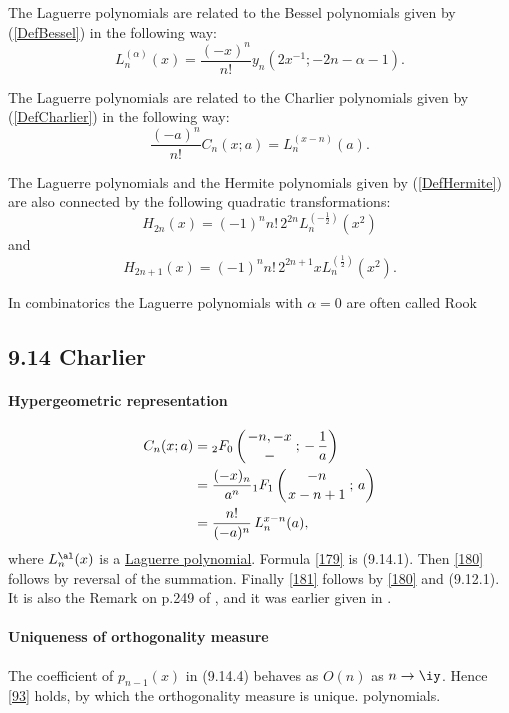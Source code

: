 \documentclass[envcountchap,graybox]{svmono}
\newcommand{\hyp}[5]{\mbox{}_{#1}{F}_{#2}
\left(\genfrac{}{}{0pt}{}{#3}{#4}\,;\,#5\right)}
\begin{document}
\noindent
The Laguerre polynomials are related to the Bessel polynomials given by (\ref{DefBessel})
in the following way:
$$L_n^{(\alpha)}(x)=\frac{(-x)^n}{n!}y_n(2x^{-1};-2n-\alpha-1).$$

\noindent
The Laguerre polynomials are related to the Charlier polynomials given by (\ref{DefCharlier})
in the following way:
$$\frac{(-a)^n}{n!}C_n(x;a)=L_n^{(x-n)}(a).$$

\noindent
The Laguerre polynomials and the Hermite polynomials given by (\ref{DefHermite}) are also
connected by the following quadratic transformations:
$$H_{2n}(x)=(-1)^nn!\,2^{2n}L_n^{(-\frac{1}{2})}(x^2)$$
and
$$H_{2n+1}(x)=(-1)^nn!\,2^{2n+1}xL_n^{(\frac{1}{2})}(x^2).$$

\noindent
In combinatorics the Laguerre polynomials with $\alpha=0$ are often called Rook
\subsection*{9.14 Charlier}
\label{sec9.14}
%
\paragraph{Hypergeometric representation}
\begin{align}
C_n(x;a)&=\hyp20{-n,-x}-{-\,\frac1a}
\label{179}\\
&=\frac{(-x)_n}{a^n} \hyp11{-n}{x-n+1}a
\label{180}\\
&=\frac{n!}{(-a)^n}\,L_n^{x-n}(a),
\label{181}
\end{align}
where $L_n^\al(x)$ is a
\hyperref[sec9.12]{Laguerre polynomial}.
Formula \eqref{179} is (9.14.1). Then \eqref{180} follows by reversal
of the summation. Finally \eqref{181} follows by \eqref{180} and
(9.12.1). It is also the Remark on p.249 of , and it
was earlier given in .
%
\paragraph{Uniqueness of orthogonality measure}
The coefficient of $p_{n-1}(x)$ in (9.14.4) behaves as $O(n)$ as $n\to\iy$.
Hence \eqref{93} holds, by which the orthogonality measure is unique.
polynomials.
\end{document}

